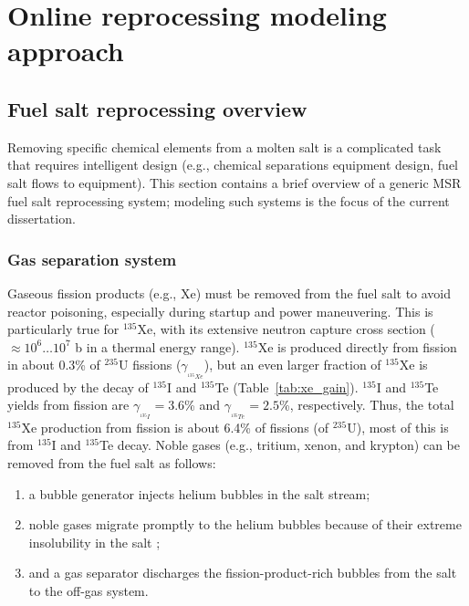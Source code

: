 \chapter{Online reprocessing modeling approach}
\section{Fuel salt reprocessing overview} \label{sec:reproc-plant}
Removing specific chemical elements from a molten salt is a complicated 
task that requires intelligent design (e.g., chemical separations equipment 
design, fuel salt flows to equipment). This section contains a brief overview 
of a generic \gls{MSR} fuel salt reprocessing system; modeling such systems is 
the focus of the current dissertation.

\subsection{Gas separation system} \label{sec:gas-separ}
Gaseous fission products (e.g., Xe) must be removed from the fuel salt 
to avoid reactor poisoning, especially during startup and power maneuvering. 
This is particularly true for $^{135}$Xe, with its extensive neutron capture 
cross section ($\approx10^6\dots10^7$ b in a thermal energy range). $^{135}$Xe 
is produced directly from fission in about 0.3\% of $^{235}$U fissions 
($\gamma_{_{^{135}Xe}}$), but an even larger fraction of $^{135}$Xe is 
produced by the decay of $^{135}$I and $^{135}$Te (Table~\ref{tab:xe_gain}). 
$^{135}$I and $^{135}$Te yields from fission are 
$\gamma_{_{^{135}I}}\!=3.6$\% and $\gamma_{_{^{135}Te}}\!=2.5$\%, 
respectively. Thus, the total $^{135}$Xe production from fission is about 
6.4\% of fissions (of $^{235}$U), most of this is from $^{135}$I and 
$^{135}$Te decay. Noble gases (e.g., tritium, xenon, and krypton) can be 
removed from the fuel salt as follows:
\begin{enumerate}[label=(\alph*)]
	\item a bubble generator injects helium bubbles in the salt stream;
	\item noble gases migrate promptly to the helium bubbles because 
	of their extreme insolubility in the salt 
	\cite{robertson_conceptual_1971};
	\item and a gas separator discharges the fission-product-rich bubbles from 
	the salt to the off-gas system.
\end{enumerate}
